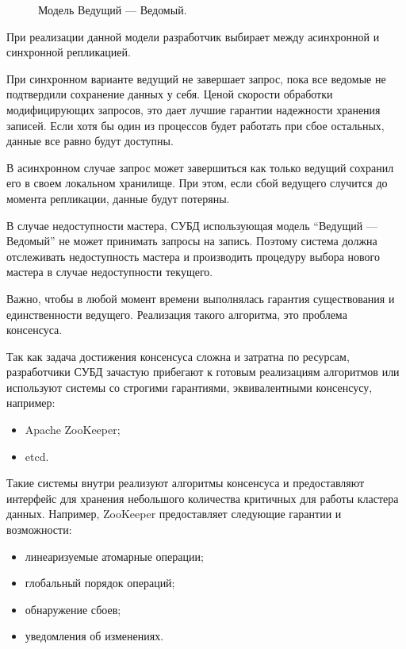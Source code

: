 \documentclass[14pt, russian]{scrartcl}
\begin{document}
\begin{figure}[H]
  \centering
  \begin{minipage}[t]{\textwidth}
    \centering
    
  \end{minipage}
  \caption{Модель Ведущий --- Ведомый.}
  \label{fig:master-follwer}
\end{figure}

При реализации данной модели разработчик выбирает между асинхронной и синхронной
репликацией.

При синхронном варианте ведущий не завершает запрос, пока все ведомые не
подтвердили сохранение данных у себя. Ценой скорости обработки модифицирующих
запросов, это дает лучшие гарантии надежности хранения записей. Если хотя бы
один из процессов будет работать при сбое остальных, данные все равно будут
доступны.

В асинхронном случае запрос может завершиться как только ведущий сохранил его в
своем локальном хранилище. При этом, если сбой ведущего случится до момента
репликации, данные будут потеряны.


В случае недоступности мастера, СУБД использующая модель ``Ведущий --- Ведомый''
не может принимать запросы на запись. Поэтому система должна отслеживать
недоступность мастера и производить процедуру выбора нового мастера в случае
недоступности текущего.

Важно, чтобы в любой момент времени выполнялась гарантия существования и
единственности ведущего. Реализация такого алгоритма, это проблема консенсуса.

Так как задача достижения консенсуса сложна и затратна по ресурсам, разработчики
СУБД зачастую прибегают к готовым реализациям алгоритмов или используют системы
со строгими гарантиями, эквивалентными консенсусу, например:

\begin{itemize}
  \item Apache ZooKeeper\cite{zookeeper};
  \item etcd\cite{etcd}.
\end{itemize}

Такие системы внутри реализуют алгоритмы консенсуса и предоставляют интерфейс
для хранения небольшого количества критичных для работы кластера данных.
Например, ZooKeeper предоставляет следующие гарантии и
возможности\cite{kleppmann2019designing}:

\begin{itemize}
  \item линеаризуемые атомарные операции;
  \item глобальный порядок операций;
  \item обнаружение сбоев;
  \item уведомления об изменениях.
\end{itemize}
\end{document}
